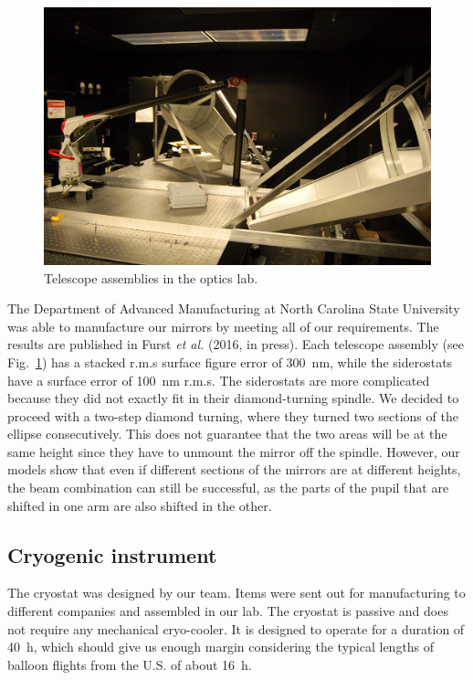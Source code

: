 \begin{figure}[!h]
		\centering
		\includegraphics[width=\textwidth]{Figures/TelescopeAssemblies.jpg} 
		\caption[Telescope assemblies]{Telescope assemblies in the optics lab.}
		\label{fig:TelescopeAssemblies}
\end{figure}



The Department of Advanced Manufacturing at North Carolina State University was able to manufacture our mirrors by meeting all of our requirements. The results are published in Furst \textit{et al.} (2016, in press). Each telescope assembly (see Fig.~\ref{fig:TelescopeAssemblies}) has a stacked r.m.s surface figure error of \SI{300}{\nano\meter}, while the siderostats have a surface error of \SI{100}{\nano\meter} r.m.s. The siderostats are more complicated because they did not exactly fit in their diamond-turning spindle. We decided to proceed with a two-step diamond turning, where they turned two sections of the ellipse consecutively. This does not guarantee that the two areas will be at the same height since they have to unmount the mirror off the spindle. However, our models show that even if different sections of the mirrors are at different heights, the beam combination can still be successful, as the parts of the pupil that are shifted in one arm are also shifted in the other. 




\subsection{Cryogenic instrument}

The cryostat was designed by our team. Items were sent out for manufacturing to different companies and assembled in our lab. The cryostat is passive and does not require any mechanical cryo-cooler. It is designed to operate for a duration of \SI{40}{\hour}, which should give us enough margin considering the typical lengths of balloon flights from the U.S. of about \SI{16}{\hour}. 


